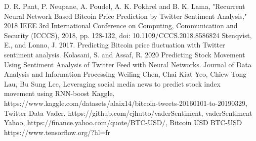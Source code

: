 \documentclass[conference]{IEEEtran}
\begin{document}
\begin{thebibliography}{00}
 D. R. Pant, P. Neupane, A. Poudel, A. K. Pokhrel and B. K. Lama, "Recurrent Neural Network Based Bitcoin Price Prediction by Twitter Sentiment Analysis," 2018 IEEE 3rd International Conference on Computing, Communication and Security (ICCCS), 2018, pp. 128-132, doi: 10.1109/CCCS.2018.8586824
 Stenqvist, E., and Lonno, J. 2017. Predicting Bitcoin price fluctuation with Twitter sentiment analysis.
Kolasani, S. and Assaf, R. 2020 Predicting Stock Movement Using Sentiment Analysis of Twitter Feed with Neural Networks. Journal of Data Analysis and Information Processing
 Weiling Chen, Chai Kiat Yeo, Chiew Tong Lau, Bu Sung Lee, Leveraging social media news to predict stock index movement using RNN-boost
Kaggle, https://www.kaggle.com/datasets/alaix14/bitcoin-tweets-20160101-to-20190329, Twitter Data
 Vader, https://github.com/cjhutto/vaderSentiment, vaderSentiment
Yahoo, https://finance.yahoo.com/quote/BTC-USD/, Bitcoin USD BTC-USD
 https://www.tensorflow.org/?hl=fr

\end{thebibliography}
\end{document}

